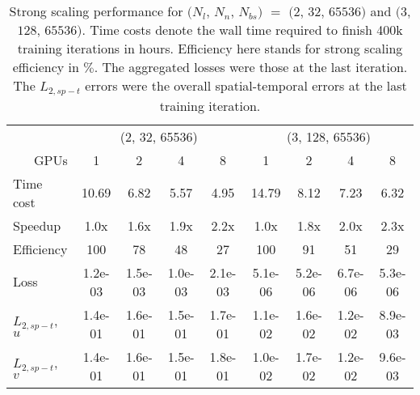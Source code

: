 \begin{table}[hbt!]
\centering
\singlespacing
\caption[
    PINNs, 2D TGV, $Re=100$: strong scaling performance for $(N_l$, $N_n$, $N_{bs})$ $=$ $(2$, $32$, $65536)$ and $(3$, $128$, $65536)$
]{
    Strong scaling performance for $(N_l$, $N_n$, $N_{bs})$ $=$ $(2$, $32$, $65536)$ and $(3$, $128$, $65536)$.%
    Time costs denote the wall time required to finish 400k training iterations in hours.%
    Efficiency here stands for strong scaling efficiency in $\%$.%
    The aggregated losses were those at the last iteration.%
    The $L_{2,sp-t}$ errors were the overall spatial-temporal errors at the last training iteration.%
}
\label{table:strong-scaling-perf}
\small
\begin{tabular}{lcccccccc}
\toprule
 & \multicolumn{4}{c}{(2, 32, 65536)} & \multicolumn{4}{c}{(3, 128, 65536)} \\
\cmidrule(rl){2-5} \cmidrule(rl){6-9}
\multicolumn{1}{r}{GPUs} & 1 & 2 & 4 & 8 & 1 & 2 & 4 & 8 \\
\midrule
Time cost & 10.69 &  6.82 &  5.57 &  4.95 & 14.79 &  8.12 &  7.23 &  6.32 \\
\addlinespace
Speedup & 1.0x & 1.6x & 1.9x & 2.2x & 1.0x & 1.8x & 2.0x & 2.3x \\
\addlinespace
Efficiency & 100 & 78 & 48 & 27 & 100 & 91 & 51 & 29 \\
\addlinespace
Loss & 1.2e-03 & 1.5e-03 & 1.0e-03 & 2.1e-03 & 5.1e-06 & 5.2e-06 & 6.7e-06 & 5.3e-06 \\
\addlinespace
$L_{2,sp-t}$, $u$ & 1.4e-01 & 1.6e-01 & 1.5e-01 & 1.7e-01 & 1.1e-02 & 1.6e-02 & 1.2e-02 & 8.9e-03 \\
\addlinespace
$L_{2,sp-t}$, $v$ & 1.4e-01 & 1.6e-01 & 1.5e-01 & 1.8e-01 & 1.0e-02 & 1.7e-02 & 1.2e-02 & 9.6e-03 \\
\bottomrule
\end{tabular}
\normalsize
\end{table}
